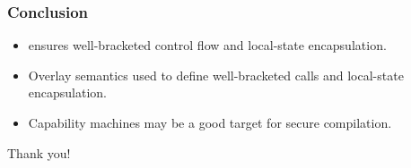 \documentclass[aspectratio=169]{beamer}
\begin{document}
\begin{frame}
  \frametitle{Conclusion}
\begin{itemize}
\item \stktokens{} ensures well-bracketed control flow and local-state encapsulation.
\item Overlay semantics used to define well-bracketed calls and local-state encapsulation.
\item Capability machines may be a good target for secure compilation.
\end{itemize}
\end{frame}

\begin{frame}
  \centering
  Thank you!
\end{frame}

\appendix
\end{document}
